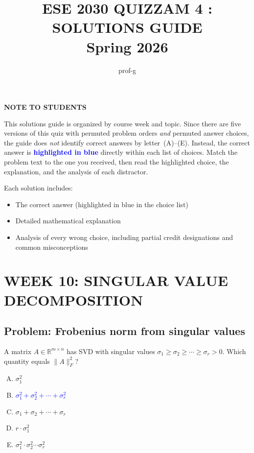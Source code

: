 \documentclass[12pt]{amsart}
\title{ESE 2030 QUIZZAM 4 : SOLUTIONS GUIDE \\ Spring 2026}
\author{prof-g}
\begin{document}
\maketitle

\begin{center}
{\bf NOTE TO STUDENTS}
\end{center}

This solutions guide is organized by course week and topic.
Since there are five versions of this quiz with permuted problem orders \emph{and}
permuted answer choices, the guide does \emph{not} identify correct answers by
letter~(A)--(E).
Instead, the correct answer is \textcolor{blue}{\textbf{highlighted in blue}}
directly within each list of choices.
Match the problem text to the one you received, then read the highlighted
choice, the explanation, and the analysis of each distractor.

Each solution includes:
\begin{itemize}
\item The correct answer (highlighted in blue in the choice list)
\item Detailed mathematical explanation
\item Analysis of every wrong choice, including partial credit designations and common misconceptions
\end{itemize}

\newpage

\section*{WEEK 10: SINGULAR VALUE DECOMPOSITION}

\subsection*{Problem: Frobenius norm from singular values}

A matrix $A \in \mathbb{R}^{m \times n}$ has SVD with singular values
$\sigma_1 \geq \sigma_2 \geq \cdots \geq \sigma_r > 0$.
Which quantity equals $\|A\|_F^2$?

\begin{enumerate}[(A)]
\item $\sigma_1^2$
\item \textcolor{blue}{\textbf{$\sigma_1^2 + \sigma_2^2 + \cdots + \sigma_r^2$}}
\item $\sigma_1 + \sigma_2 + \cdots + \sigma_r$
\item $r \cdot \sigma_1^2$
\item $\sigma_1^2 \cdot \sigma_2^2 \cdots \sigma_r^2$
\end{enumerate}
\end{document}
